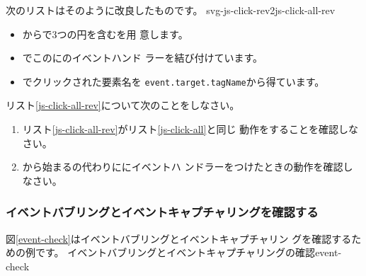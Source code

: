 次のリストはそのように改良したものです。
    {svg-js-click-rev2}{js-click-all-rev}
\begin{itemize}
 \item {}からで3つの円を含むを用
       意します。
 \item {}でこのにのイベントハンド
       ラーを結び付けています。
 \item {}でクリックされた要素名を
       \texttt{event.target.tagName}から得ています。
\end{itemize}
\begin{Problem}\upshape
 リスト\ref{js-click-all-rev}について次のことをしなさい。
\begin{enumerate}
 \item リスト\ref{js-click-all-rev}がリスト\ref{js-click-all}と同じ
       動作をすることを確認しなさい。
 \item {}から始まるの代わりににイベントハ
       ンドラーをつけたときの動作を確認しなさい。
\end{enumerate}
\end{Problem}
\iffalse
\subsubsection{イベントバブリングとイベントキャプチャリングを確認する}
\label{checkEventCapture}
図\ref{event-check}はイベントバブリングとイベントキャプチャリン
グを確認するための例です。
{イベントバブリングとイベントキャプチャリングの確認}{event-check}

